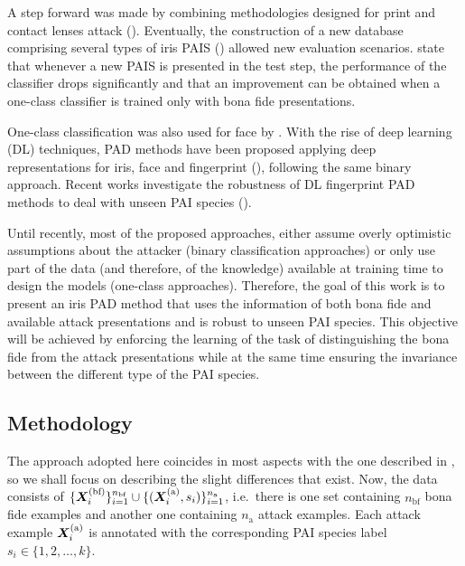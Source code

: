 A step forward was made by combining methodologies designed for print and contact lenses attack (\citet{sequeira2014ildmma}). Eventually, the construction of a new database comprising several types of iris PAIS (\citet{raghavendra2015VSIA}) allowed new evaluation scenarios. \citet{sequeira2016realistic} state that whenever a new PAIS is presented in the test step, the performance of the classifier drops significantly and that an improvement can be obtained when a one-class classifier is trained only with bona fide presentations.

One-class classification was also used for face by \citet{kittler2017faceanomaly}. With the rise of deep learning (DL) techniques, PAD methods have been proposed applying deep representations for iris, face and fingerprint (\citet{menotti2015deep,pinto2018counteracting}), following the same binary approach. Recent works investigate the robustness of DL fingerprint PAD methods to deal with unseen PAI species (\citet{tolosana2018towards}).

Until recently, most of the proposed approaches, either assume overly optimistic assumptions about the attacker  (binary classification approaches) or only use part of the data (and therefore, of the knowledge) available at training time to design the models (one-class approaches). Therefore, the goal of this work is to present an iris PAD method that uses the information of both bona fide and available attack presentations and is robust to unseen PAI species. This objective will be achieved by enforcing the learning of the task of distinguishing the bona fide from the attack presentations while at the same time ensuring the invariance between the different type of the PAI species.

\subsection{Methodology}
\label{sec:adv_iris_attack_method}
The approach adopted here coincides in most aspects with the one described in , so we shall focus on describing the slight differences that exist. Now, the data consists of $\{{\bm{X}}^{(\text{bf})}_i\}_{i=1}^{n_{\text{bf}}} \cup \{({\bm{X}}^{(\text{a})}_i,s_i)\}_{i=1}^{n_{\text{a}}}$, i.e.\ there is one set containing $n_{\text{bf}}$ bona fide examples and another one containing $n_{\text{a}}$ attack examples. Each attack example ${\bm{X}}^{(\text{a})}_i$ is annotated with the corresponding PAI species label $s_i \in \{1,2,\dots,k\}$.

